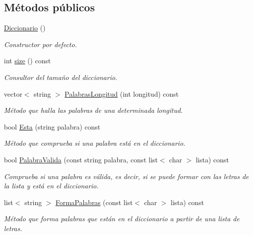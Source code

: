 \subsection*{Métodos públicos}
\begin{DoxyCompactItemize}
\item 
\mbox{\label{classDiccionario_aa0a2191ec706b256c35b5229cc197b15}} 
\hyperlink{classDiccionario_aa0a2191ec706b256c35b5229cc197b15}{Diccionario} ()
\begin{DoxyCompactList}\small\item\em Constructor por defecto. \end{DoxyCompactList}\item 
int \hyperlink{classDiccionario_a74ea14ecba52288b84ffc6ea1f2fba99}{size} () const
\begin{DoxyCompactList}\small\item\em Consultor del tamaño del diccionario. \end{DoxyCompactList}\item 
vector$<$ string $>$ \hyperlink{classDiccionario_a66cf11b04fcfea08bf292f7ecbc4e376}{Palabras\+Longitud} (int longitud) const
\begin{DoxyCompactList}\small\item\em Método que halla las palabras de una determinada longitud. \end{DoxyCompactList}\item 
bool \hyperlink{classDiccionario_a2859234e7c6a7c2cc9120b32d814e7a1}{Esta} (string palabra) const
\begin{DoxyCompactList}\small\item\em Método que comprueba si una palabra está en el diccionario. \end{DoxyCompactList}\item 
bool \hyperlink{classDiccionario_a8df85eb554f7539a5d690fd5b531627b}{Palabra\+Valida} (const string palabra, const list$<$ char $>$ lista) const
\begin{DoxyCompactList}\small\item\em Comprueba si una palabra es válida, es decir, si se puede formar con las letras de la lista y está en el diccionario. \end{DoxyCompactList}\item 
list$<$ string $>$ \hyperlink{classDiccionario_ac46deb245f9647bd4c2b9e53bf09d355}{Forma\+Palabras} (const list$<$ char $>$ lista) const
\begin{DoxyCompactList}\small\item\em Método que forma palabras que están en el diccionario a partir de una lista de letras. \end{DoxyCompactList}\item 

\end{DoxyCompactItemize}
